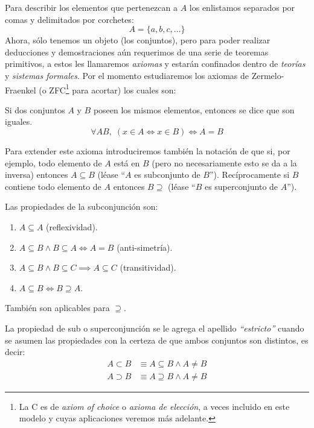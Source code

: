\documentclass[11pt,oneside,a4paper]{book}
\begin{document}
Para describir los elementos que pertenezcan a $A$ los enlistamos separados por comas y delimitados por corchetes:
$$A=\{a,b,c,\dots\}$$
Ahora, sólo tenemos un objeto (los conjuntos), pero para poder realizar deducciones y demostraciones aún requerimos de una serie de teoremas primitivos, a estos les llamaremos \textit{axiomas} y estarán confinados dentro de \textit{teorías} y \textit{sistemas formales}. Por el momento estudiaremos los axiomas de Zermelo-Fraenkel (o ZFC\footnote{La C es de \textit{axiom of choice} o \textit{axioma de elección}, a veces incluido en este modelo y cuyas aplicaciones veremos más adelante.} para acortar) los cuales son:
\begin{axiom}[de Extensionalidad]
Si dos conjuntos $A$ y $B$ poseen los mismos elementos, entonces se dice que son iguales.
$$
\forall AB,\;(x\in A\iff x\in B)\iff A=B
$$
\end{axiom}
Para extender este axioma introduciremos también la notación de que si, por ejemplo, todo elemento de $A$ está en $B$ (pero no necesariamente esto se da a la inversa) entonces $A\subseteq B$ (léase ``$A$ es subconjunto de $B$''). Recíprocamente si $B$ contiene todo elemento de $A$ entonces $B\supseteq$ (léase ``$B$ es superconjunto de $A$'').

\begin{prop}
Las propiedades de la subconjunción son:
\begin{enumerate}
\item $A\subseteq A$ (reflexividad).
\item $A\subseteq B\wedge B\subseteq A\iff A=B$ (anti-simetría).
\item $A\subseteq B\wedge B\subseteq C\implies A\subseteq C$ (transitividad).
\item $A\subseteq B\iff B\supseteq A$.
\end{enumerate}
También son aplicables para $\supseteq$.
\end{prop}

La propiedad de sub o superconjunción se le agrega el apellido \textit{``estricto''} cuando se asumen las propiedades con la certeza de que ambos conjuntos son distintos, es decir:
$$
\begin{aligned}
A\subset B&\equiv A\subseteq B\wedge A\neq B\\
A\supset B&\equiv A\supseteq B\wedge A\neq B
\end{aligned}
$$
\end{document}
